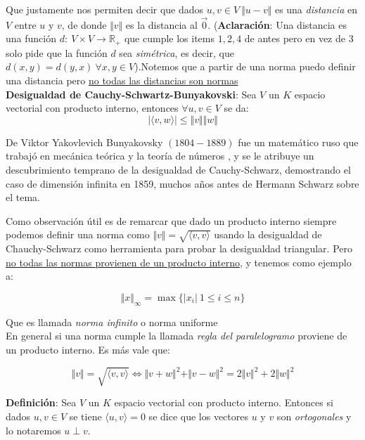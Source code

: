 \documentclass[a4paper,spanish]{article}
\def\R {\mathbb{R}}
\numberwithin{equation}{section}
\begin{document}
Que justamente nos permiten decir que dados $u,v \in V \ \Vert{u-v}\Vert$ es una \textit{distancia} en $V$ entre $u$ y $v$, de donde $\Vert{v}\Vert$ es la distancia al $\vec{0}$. (\textbf{Aclaraci\'on}: Una distancia es una funci\'on $d:\ V \times V \rightarrow \R_{+}$ que cumple los items $1,2,4$ de antes pero en vez de $3$ solo pide que la funci\'on $d$ sea \textit{sim\'etrica}, es decir, que $d\left(x,y\right)=d\left(y,x\right) \ \forall x,y \in V$).Notemos que a partir de una norma puedo definir una distancia pero \underline{no todas las distancias son normas}\\

\textbf{Desigualdad de Cauchy-Schwartz-Bunyakovski}: Sea $V$ un $K$ espacio vectorial con producto interno, entonces $\forall u,v \in V$ se da:
\[ \vert\langle{v,w}\rangle\vert \leq \Vert{v}\Vert \Vert{w}\Vert \]

De Viktor Yakovlevich Bunyakovsky $(1804-1889)$ fue un matem\'atico ruso que trabaj\'o en mec\'anica te\'orica y la teor\'ia de n\'umeros , y se le atribuye un descubrimiento temprano de la desigualdad de Cauchy-Schwarz, demostrando el caso de dimensi\'on infinita en 1859, muchos a\~nos antes de Hermann Schwarz sobre el tema.

Como observaci\'on \'util es de remarcar que dado un producto interno siempre podemos definir una norma como $\Vert{v}\Vert=\sqrt{\langle{v,v}\rangle}$ usando la desigualdad de Chauchy-Schwarz como herramienta para probar la desigualdad triangular. Pero \underline{no todas las normas provienen de un producto interno}, y tenemos como ejemplo a:

\[\Vert{x}\Vert_\infty = \max \lbrace{\vert{x_i}\vert \ 1\leq i \leq n}\rbrace\]

Que es llamada \textit{norma infinito} o norma uniforme \\

En general si una norma cumple la llamada \textit{regla del paralelogramo} proviene de un producto interno. Es m\'as vale que:

\[\Vert{v}\Vert=\sqrt{\langle{v,v}\rangle} \Longleftrightarrow \Vert{v+w}\Vert ^2 + \Vert{v-w}\Vert ^2 = 2 \Vert{v}\Vert ^2 + 2\Vert{w}\Vert ^2\]

\textbf{Definici\'on}: Sea $V$ un $K$ espacio vectorial con producto interno. Entonces si dados $u,v \in V$ se tiene $\langle{u,v}\rangle=0$ se dice que los vectores $u$ y $v$ son \textit{ortogonales} y lo notaremos $u\perp v$.\\
\end{document}
